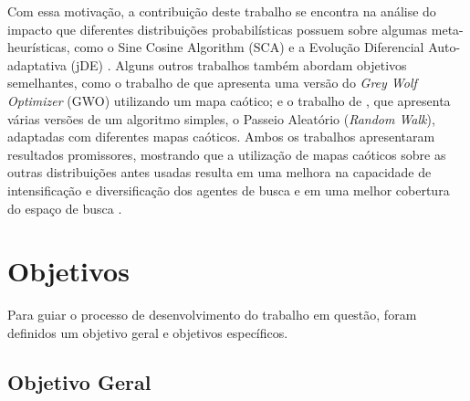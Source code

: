 Com essa motivação, a contribuição deste trabalho se encontra na análise do impacto que diferentes distribuições probabilísticas possuem sobre algumas meta-heurísticas, como o Sine Cosine Algorithm (SCA) \cite{mirjalili} e a Evolução Diferencial Auto-adaptativa (jDE) \cite{brest}. Alguns outros trabalhos também abordam objetivos semelhantes, como o trabalho de \cite{saxena} que apresenta uma versão do \textit{Grey Wolf Optimizer} (GWO) utilizando um mapa caótico; e o trabalho de \cite{jana}, que apresenta várias versões de um algoritmo simples, o Passeio Aleatório (\textit{Random Walk}), adaptadas com diferentes mapas caóticos. Ambos os trabalhos apresentaram resultados promissores, mostrando que a utilização de mapas caóticos sobre as outras distribuições antes usadas resulta em uma melhora na capacidade de intensificação e diversificação dos agentes de busca \cite{saxena} e em uma melhor cobertura do espaço de busca \cite{jana}.





\section{Objetivos}

Para guiar o processo de desenvolvimento do trabalho em questão, foram definidos um objetivo geral e objetivos específicos.

\subsection{Objetivo Geral}

